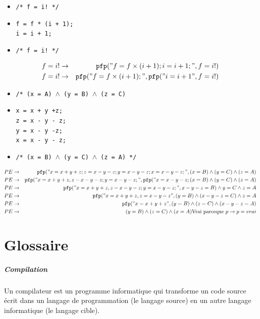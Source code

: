 \documentclass[12pt,a4paper,openany]{book}
\begin{document}
{	\begin{itemize}
		\item \texttt{/* f = i! */}
		\item \texttt{f = f * (i + 1);\\i = i + 1;}
		\item \texttt{/* f = i! */}
	\end{itemize}
	\begin{eqnarray*}
		f = i! &\rightarrow& \texttt{pfp}("f = f\times (i+1); i = i +1;", f= i!)\\
		f=i!&\rightarrow&\texttt{pfp}("f=f\times(i+1);",\texttt{pfp}("i=i+1",f=i!)\\
	\end{eqnarray*}
	\begin{itemize}
		\item \texttt{/* (x = A) $\wedge$ (y = B) $\wedge$ (z = C)}
		\item \texttt{x = x + y +z;\\z = x - y - z;\\y = x - y -z;\\x = x - y - z;}
		\item \texttt{/* (x = B) $\wedge$ (y = C) $\wedge$ (z = A) */}
	\end{itemize}
	\begin{eqnarray*}
		PE &\rightarrow& \texttt{pfp}("x=x+y+z;z=x-y-z;y=x-y-z;x=x-y-z;", (x=B)\wedge(y=C)\wedge(z=A)\\
		PE &\rightarrow& \texttt{pfp}("x=x+y+z, z-x-y-z;y=x-y-z;", \texttt{pfp}("x=x-y-z;(x=B)\wedge(y=C)\wedge(z=A)\\
		PE &\rightarrow& \texttt{pfp}("x=x+y+z, z-x-y-z;y=x-y-z;", x-y-z=B)\wedge y=C \wedge z = A\\
		PE &\rightarrow& \texttt{pfp}("x=x+y+z,z=x-y-z", (y=B)\wedge (x-y-z=C)\wedge z = A\\
		PE &\rightarrow& \texttt{pfp}("x=x+y+z", (y=B)\wedge (z=C) \wedge (x-y-z=A)\\
		PE &\rightarrow& (y=B) \wedge (z=C)\wedge(x=A) \textmd{Vrai parceque }p\rightarrow p = vrai
	\end{eqnarray*}
	
}
\appendix



	\chapter{Glossaire}
	\paragraph{Compilation} Un compilateur est un programme informatique qui transforme un code source écrit dans un langage de programmation (le langage source) en un autre langage informatique (le langage cible).
\end{document}
